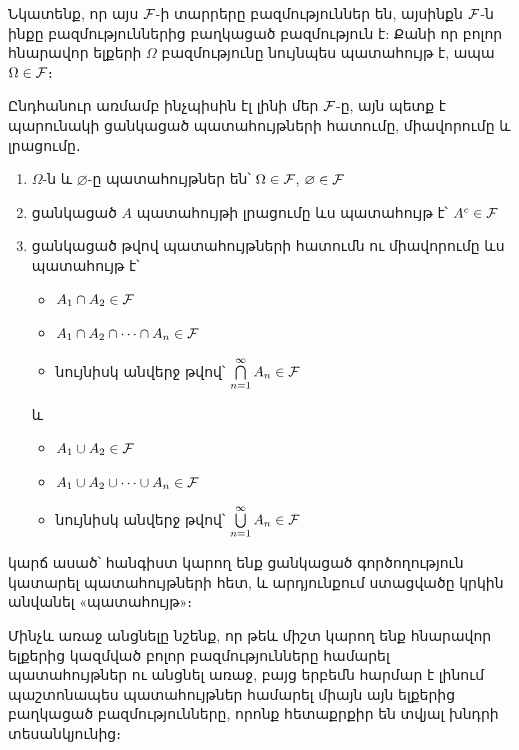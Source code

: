Նկատենք, որ այս $\mathcal{F}$-ի տարրերը բազմություններ են, այսինքն $\mathcal{F}$-ն ինքը բազմություններից բաղկացած բազմություն է: Քանի որ բոլոր հնարավոր ելքերի $\Omega$ բազմությունը նույնպես պատահույթ է, ապա $\Omega \in \mathcal{F}$։ 

Ընդհանուր առմամբ ինչպիսին էլ լինի մեր $\mathcal{F}$-ը, այն պետք է պարունակի ցանկացած պատահույթների հատումը, միավորումը և լրացումը․
\begin{enumerate}
    \item $\Omega$-ն և $\varnothing$-ը պատահույթներ են՝ $\Omega \in \mathcal{F}$, $\varnothing \in \mathcal{F}$

    \item ցանկացած $A$ պատահույթի լրացումը ևս պատահույթ է՝ $A^c \in \mathcal{F}$

    \item ցանկացած թվով պատահույթների հատումն ու միավորումը ևս պատահույթ է՝ 
    \begin{itemize}
        \item $A_1 \cap A_2 \in \mathcal{F}$
        \item $A_1 \cap A_2 \cap \dots \cap A_n \in \mathcal{F}$
        \item նույնիսկ անվերջ թվով՝ $\bigcap\limits_{n=1}^\infty A_n \in \mathcal{F}$
    \end{itemize}
    և
    \begin{itemize}
        \item $A_1 \cup A_2 \in \mathcal{F}$
        \item $A_1 \cup A_2 \cup \dots \cup A_n \in \mathcal{F}$
        \item նույնիսկ անվերջ թվով՝ $\bigcup\limits_{n=1}^\infty A_n \in \mathcal{F}$
    \end{itemize}
\end{enumerate}
կարճ ասած՝ հանգիստ կարող ենք ցանկացած գործողություն կատարել պատահույթների հետ, և արդյունքում ստացվածը կրկին անվանել «պատահույթ»։

\newpage


Մինչև առաջ անցնելը նշենք, որ թեև միշտ կարող ենք հնարավոր ելքերից կազմված բոլոր բազմությունները համարել պատահույթներ ու անցնել առաջ, բայց երբեմն հարմար է լինում պաշտոնապես պատա\-հույթներ համարել միայն այն ելքերից բաղկացած բազմությունները, որոնք հետաքրքիր են տվյալ խնդրի տեսանկյունից։

